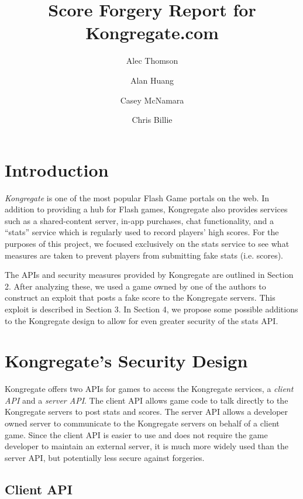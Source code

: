 \documentclass [11pt,twocolumn] {article}
\begin{document}
\title { Score Forgery Report for Kongregate.com}
\author { Alec Thomson \and Alan Huang \and Casey McNamara \and Chris Billie }
\date {}

\maketitle

\section { Introduction }

\emph{Kongregate} is one of the most popular Flash Game portals on the web. In addition to providing a hub for Flash games, Kongregate also provides services such as a shared-content server, in-app purchases, chat functionality, and a ``stats'' service which is regularly used to record players' high scores. For the purposes of this project, we focused exclusively on the stats service to see what measures are taken to prevent players from submitting fake stats (i.e. scores). 

The APIs and security measures provided by Kongregate are outlined in Section 2. After analyzing these, we used a game owned by one of the authors to construct an exploit that posts a fake score to the Kongregate servers. This exploit is described in Section 3. In Section 4, we propose some possible additions to the Kongregate design to allow for even greater security of the stats API. 

\section { Kongregate's Security Design }

Kongregate offers two APIs for games to access the Kongregate services, a \emph{client API} and a \emph{server API}. The client API allows game code to talk directly to the Kongregate servers to post stats and scores. The server API allows a developer owned server to communicate to the Kongregate servers on behalf of a client game. Since the client API is easier to use and does not require the game developer to maintain an external server, it is much more widely used than the server API, but potentially less secure against forgeries. 

\subsection {Client API}
\end{document}
